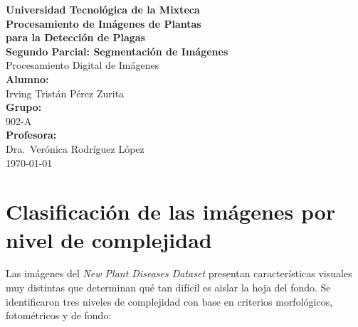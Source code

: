 \documentclass[11pt,a4paper]{article}
\begin{document}
\begin{titlepage}
    \centering
    \vspace*{1.5cm}

    {\Huge \textbf{Universidad Tecnológica de la Mixteca}}\\[1.5cm]

    {\huge \textbf{Procesamiento de Imágenes de Plantas \\
    para la Detección de Plagas}}\\[1.2cm]

    {\Large \textcolor{verde}{\textbf{Segundo Parcial: Segmentación de Imágenes}}}\\[0.8cm]

    {\large Procesamiento Digital de Imágenes}\\[2.0cm]

    {\large \textbf{Alumno:}}\\
    {\Large Irving Tristán Pérez Zurita}\\[0.5cm]

    {\large \textbf{Grupo:}}\\
    {\Large 902-A}\\[1.5cm]

    {\large \textbf{Profesora:}}\\
    {\Large Dra.\ Verónica Rodríguez López}\\[1.5cm]

    \vfill
    {\large \today}
\end{titlepage}

\newpage
\tableofcontents
\newpage

\section{Clasificación de las imágenes por nivel de complejidad}

Las imágenes del \textit{New Plant Diseases Dataset} presentan características
visuales muy distintas que determinan qué tan difícil es aislar la hoja del
fondo. Se identificaron tres niveles de complejidad con base en criterios
morfológicos, fotométricos y de fondo:
\end{document}
